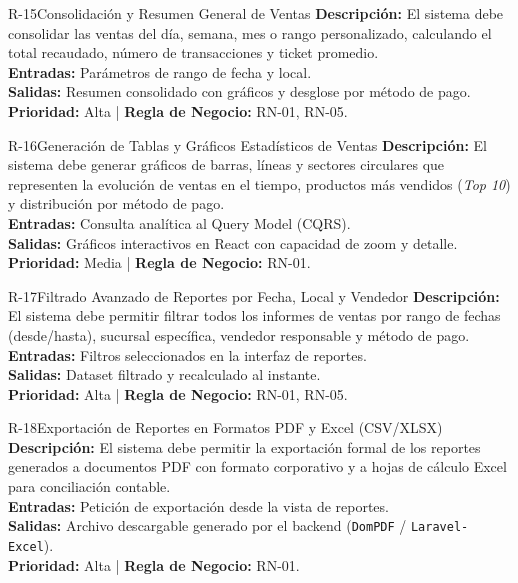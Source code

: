 \begin{reqbox}{R-15}{Consolidación y Resumen General de Ventas}
\textbf{Descripción:} El sistema debe consolidar las ventas del día, semana, mes o rango personalizado, calculando el total recaudado, número de transacciones y ticket promedio.\\
\textbf{Entradas:} Parámetros de rango de fecha y local.\\
\textbf{Salidas:} Resumen consolidado con gráficos y desglose por método de pago.\\
\textbf{Prioridad:} Alta | \textbf{Regla de Negocio:} RN-01, RN-05.
\end{reqbox}

\begin{reqbox}{R-16}{Generación de Tablas y Gráficos Estadísticos de Ventas}
\textbf{Descripción:} El sistema debe generar gráficos de barras, líneas y sectores circulares que representen la evolución de ventas en el tiempo, productos más vendidos (\textit{Top 10}) y distribución por método de pago.\\
\textbf{Entradas:} Consulta analítica al Query Model (CQRS).\\
\textbf{Salidas:} Gráficos interactivos en React con capacidad de zoom y detalle.\\
\textbf{Prioridad:} Media | \textbf{Regla de Negocio:} RN-01.
\end{reqbox}

\begin{reqbox}{R-17}{Filtrado Avanzado de Reportes por Fecha, Local y Vendedor}
\textbf{Descripción:} El sistema debe permitir filtrar todos los informes de ventas por rango de fechas (desde/hasta), sucursal específica, vendedor responsable y método de pago.\\
\textbf{Entradas:} Filtros seleccionados en la interfaz de reportes.\\
\textbf{Salidas:} Dataset filtrado y recalculado al instante.\\
\textbf{Prioridad:} Alta | \textbf{Regla de Negocio:} RN-01, RN-05.
\end{reqbox}

\begin{reqbox}{R-18}{Exportación de Reportes en Formatos PDF y Excel (CSV/XLSX)}
\textbf{Descripción:} El sistema debe permitir la exportación formal de los reportes generados a documentos PDF con formato corporativo y a hojas de cálculo Excel para conciliación contable.\\
\textbf{Entradas:} Petición de exportación desde la vista de reportes.\\
\textbf{Salidas:} Archivo descargable generado por el backend (\texttt{DomPDF} / \texttt{Laravel-Excel}).\\
\textbf{Prioridad:} Alta | \textbf{Regla de Negocio:} RN-01.
\end{reqbox}

